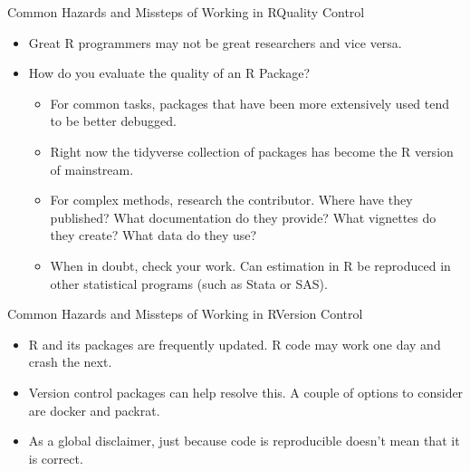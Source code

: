 \documentclass{beamer}
\begin{document}
\begin{frame}{Common Hazards and Missteps of Working in R}{Quality Control}
\begin{itemize}
    \item Great R programmers may not be great researchers and vice versa.
    \item How do you evaluate the quality of an R Package?
    \begin{itemize}
        \item For common tasks, packages that have been more extensively used tend to be better debugged.  
        \item Right now the tidyverse collection of packages has  become the R version of mainstream.
        \item For complex methods, research the contributor.  Where have they published?  What documentation do they provide?  What vignettes do they create?  What data do they use?
        \item When in doubt, check your work.  Can estimation in R be reproduced in other statistical programs (such as Stata or SAS).  
    \end{itemize}
\end{itemize}
\end{frame}

\begin{frame}{Common Hazards and Missteps of Working in R}{Version Control}
\begin{itemize}
    \item R and its packages are frequently updated.  R code may work one day and crash the next.
    \item Version control packages can help resolve this.  A couple of options to consider are docker and packrat.
    \item As a global disclaimer, just because code is reproducible doesn't mean that it is correct.  
    
\end{itemize}
\end{frame}
\end{document}
